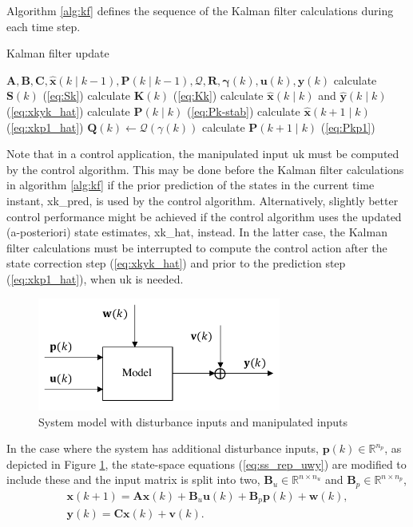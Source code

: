 Algorithm \ref{alg:kf} defines the sequence of the Kalman filter calculations during each time step. 
\begin{algorithm}
	\caption{Kalman filter update}\label{alg:kf}
	\begin{algorithmic}
		\Require $\mathbf{A},\mathbf{B},\mathbf{C},\mathbf{\hat{x}}(k \mid k-1), \mathbf{P}(k \mid k-1), \mathcal{Q}, \mathbf{R}, \mathbf{\gamma}(k), \mathbf{u}(k), \mathbf{y}(k)$
		\State calculate $\mathbf{S}(k)$ (\ref{eq:Sk})
		\State calculate $\mathbf{K}(k)$ (\ref{eq:Kk})
		\State calculate $\mathbf{\hat{x}}(k \mid k)$ and $\mathbf{\hat{y}}(k \mid k)$ (\ref{eq:xkyk_hat})
		\State calculate $\mathbf{P}(k \mid k)$ (\ref{eq:Pk-stab})
		\State calculate $\mathbf{\hat{x}}(k+1 \mid k)$ (\ref{eq:xkp1_hat})
		\State $\mathbf{Q}(k) \gets \mathcal{Q}(\gamma(k))$
		\State calculate $\mathbf{P}(k+1 \mid k)$ (\ref{eq:Pkp1})
	\end{algorithmic}
\end{algorithm}
Note that in a control application, the manipulated input \gls{uk} must be computed by the control algorithm. This may be done before the Kalman filter calculations in algorithm \ref{alg:kf} if the prior prediction of the states in the current time instant, \gls{xk_pred}, is used by the control algorithm. Alternatively, slightly better control performance might be achieved if the control algorithm uses the updated (a-posteriori) state estimates, \gls{xk_hat}, instead. In the latter case, the Kalman filter calculations must be interrupted to compute the control action after the state correction step (\ref{eq:xkyk_hat}) and prior to the prediction step (\ref{eq:xkp1_hat}), when \gls{uk} is needed.

\begin{figure}[htp]
	\centering
	\includegraphics[width=8cm]{images/model_diag_upwvy.pdf}
	\caption{System model with disturbance inputs and manipulated inputs}
	\label{fig:model_diag_upwvy}
\end{figure}
In the case where the system has additional disturbance inputs, $\mathbf{p}(k) \in \mathbb{R}^{n_p}$, as depicted in Figure \ref{fig:model_diag_upwvy}, the state-space equations (\ref{eq:ss_rep_uwy}) are modified to include these and the input matrix is split into two, $\mathbf{B}_u \in \mathbb{R}^{n \times n_u}$ and $\mathbf{B}_p \in \mathbb{R}^{n \times n_p}$,
\begin{equation} \label{eq:ss_rep_upwy}
	\begin{aligned}
		\mathbf{x}(k+1) = \mathbf{A} \mathbf{x}(k) + \mathbf{B}_u \mathbf{u}(k) + \mathbf{B}_p \mathbf{p}(k) + \mathbf{w}(k), \\
		\mathbf{y}(k) = \mathbf{C} \mathbf{x}(k) + \mathbf{v}(k).
	\end{aligned}
\end{equation}

